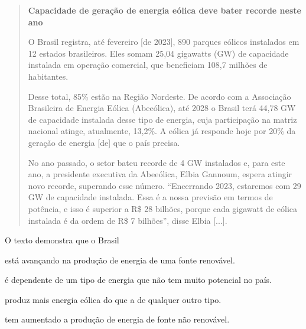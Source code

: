 \begin{quote}
\textbf{Capacidade de geração de energia eólica deve bater recorde neste ano}

O Brasil registra, até fevereiro [de 2023], 890 parques eólicos instalados em 12 estados brasileiros. Eles somam 25,04 gigawatts (GW) de capacidade instalada em operação comercial, que beneficiam 108,7 milhões de habitantes.

Desse total, 85\% estão na Região Nordeste. De acordo com a Associação Brasileira de Energia Eólica (Abeeólica), até 2028 o Brasil terá 44,78 GW de capacidade instalada desse tipo de energia, cuja participação na matriz nacional atinge, atualmente, 13,2\%. A eólica já responde hoje por 20\% da geração de energia [de] que o país precisa.

No ano passado, o setor bateu recorde de 4 GW instalados e, para este ano, a presidente executiva da Abeeólica, Elbia Gannoum, espera atingir novo recorde, superando esse número. “Encerrando 2023, estaremos com 29 GW de capacidade instalada. Essa é a nossa previsão em termos de potência, e isso é superior a R\$ 28 bilhões, porque cada gigawatt de eólica instalada é da ordem de R\$ 7 bilhões”, disse Elbia {[}...{]}.

\end{quote}

O texto demonstra que o Brasil

\begin{escolha}
\item
  está avançando na produção de energia de uma fonte renovável.
\item
  é dependente de um tipo de energia que não tem muito potencial no país.
\item
  produz mais energia eólica do que a de qualquer outro tipo.
\item
  tem aumentado a produção de energia de fonte não renovável.
\end{escolha}


